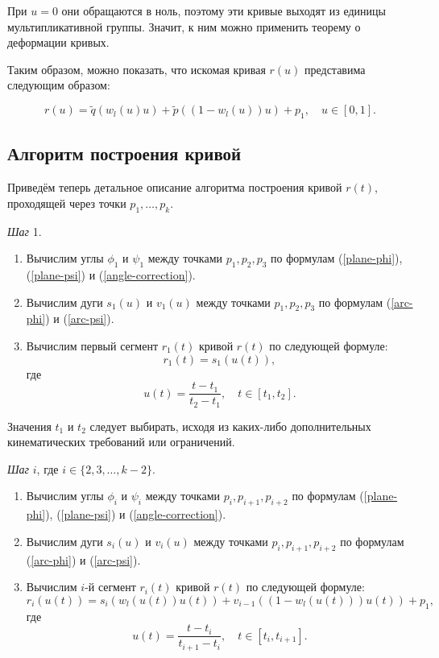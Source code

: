 При $u=0$ они обращаются в ноль, поэтому эти кривые выходят из единицы мультипликативной группы. Значит, к ним можно
применить теорему о деформации кривых.

Таким образом, можно показать, что искомая кривая $r(u)$ представима следующим образом:

$$
r(u)=\tilde q(w_l(u)u)+\tilde p((1-w_l(u))u)+p_1, \quad u \in [0,1].
$$

\subsection*{Алгоритм построения кривой}

Приведём теперь детальное описание алгоритма построения кривой $r(t)$, проходящей через точки $p_1,\dots,p_k$.

\bigskip
\textit{Шаг} 1.

\begin{enumerate}
\item Вычислим углы $\phi_1$ и $\psi_1$ между точками $p_1,p_2,p_3$ по формулам (\ref{plane-phi}), (\ref{plane-psi}) и
(\ref{angle-correction}).
\item Вычислим дуги $s_1(u)$ и $v_1(u)$ между точками $p_1,p_2,p_3$ по формулам (\ref{arc-phi}) и (\ref{arc-psi}).
\item Вычислим первый сегмент $r_1(t)$ кривой $r(t)$ по следующей формуле:
$$
r_1(t)=s_1(u(t)),
$$
\noindent где
$$
u(t)=\frac{t-t_1}{t_2-t_1}, \quad t \in [t_1,t_2].
$$
\end{enumerate}

Значения $t_1$ и $t_2$ следует выбирать, исходя из каких-либо дополнительных кинематических требований или ограничений.

\bigskip
\textit{Шаг} $i$, где $i \in \{2,3,\dots,k-2\}$.

\begin{enumerate}
\item Вычислим углы $\phi_i$ и $\psi_i$ между точками $p_i,p_{i+1},p_{i+2}$ по формулам (\ref{plane-phi}),
(\ref{plane-psi}) и (\ref{angle-correction}).
\item Вычислим дуги $s_i(u)$ и $v_i(u)$ между точками $p_i,p_{i+1},p_{i+2}$ по формулам (\ref{arc-phi}) и
(\ref{arc-psi}).
\item Вычислим $i$-й сегмент $r_i(t)$ кривой $r(t)$ по следующей формуле:
$$
r_i(u(t))=s_i(w_l(u(t))u(t))+v_{i-1}((1-w_l(u(t)))u(t))+p_1,
$$
\noindent где
$$
u(t)=\frac{t-t_i}{t_{i+1}-t_i}, \quad t \in [t_i,t_{i+1}].
$$
\end{enumerate}

